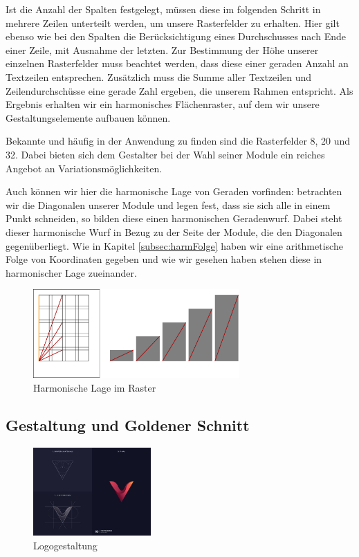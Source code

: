 \documentclass[12pt,a4paper]{article}
\begin{document}
Ist die Anzahl der Spalten festgelegt, müssen diese im folgenden Schritt in mehrere Zeilen unterteilt werden, um unsere Rasterfelder zu erhalten. Hier gilt ebenso wie bei den Spalten die Berücksichtigung eines Durchschusses nach Ende einer Zeile, mit Ausnahme der letzten. Zur Bestimmung der Höhe unserer einzelnen Rasterfelder muss beachtet werden, dass diese einer geraden Anzahl an Textzeilen entsprechen. Zusätzlich muss die Summe aller Textzeilen und Zeilendurchschüsse eine gerade Zahl ergeben, die unserem Rahmen entspricht. Als Ergebnis erhalten wir ein harmonisches Flächenraster, auf dem wir unsere Gestaltungselemente aufbauen können.

Bekannte und häufig in der Anwendung zu finden sind die Rasterfelder 8, 20 und 32.  Dabei bieten sich dem Gestalter bei der Wahl seiner Module ein reiches Angebot an Variationsmöglichkeiten.

Auch können wir hier die harmonische Lage von Geraden vorfinden: betrachten wir die Diagonalen unserer Module und legen fest, dass sie sich alle in einem Punkt schneiden, so bilden diese einen harmonischen Geradenwurf. Dabei steht dieser harmonische Wurf in Bezug zu der Seite der Module, die den Diagonalen gegenüberliegt. Wie in Kapitel \ref{subsec:harmFolge} haben wir eine arithmetische Folge von Koordinaten gegeben und wie wir gesehen haben stehen diese in harmonischer Lage zueinander.

\begin{figure}[htbp]
\centering
\includegraphics[width=0.7\textwidth]{Bilder/raster.png}
\caption{Harmonische Lage im Raster}
\label{fig:raster}
\end{figure}

\subsection{Gestaltung und Goldener Schnitt}

\begin{figure}
\includegraphics[width=0.4\textwidth]{Bilder/gr_logo.jpg} %
\caption{Logogestaltung\protect\footnotemark[8]}
\end{figure}
\end{document}
